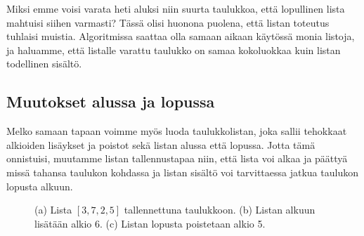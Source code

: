 Miksi emme voisi varata heti aluksi niin suurta taulukkoa,
että lopullinen lista mahtuisi siihen varmasti?
Tässä olisi huonona puolena, että listan toteutus tuhlaisi muistia.
Algoritmissa saattaa olla samaan aikaan käytössä monia listoja,
ja haluamme, että listalle varattu taulukko on samaa kokoluokkaa
kuin listan todellinen sisältö.

\subsection{Muutokset alussa ja lopussa}

Melko samaan tapaan voimme myös luoda taulukkolistan,
joka sallii tehokkaat alkioiden lisäykset ja poistot
sekä listan alussa että lopussa.
Jotta tämä onnistuisi, muutamme listan tallennustapaa niin,
että lista voi alkaa ja päättyä missä tahansa taulukon
kohdassa ja listan sisältö voi tarvittaessa jatkua taulukon lopusta alkuun.

\begin{figure}
\center
{}
\caption{(a) Lista $[3,7,2,5]$ tallennettuna taulukkoon.
(b) Listan alkuun lisätään alkio 6.
(c) Listan lopusta poistetaan alkio 5.}
\label{fig:lismol}
\end{figure}

